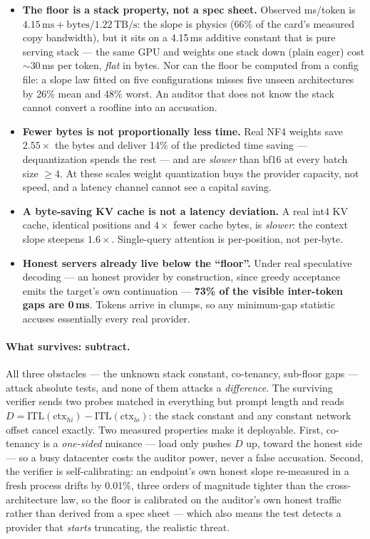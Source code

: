 \documentclass[11pt]{article}
\begin{document}
\begin{itemize}
\item \textbf{The floor is a stack property, not a spec sheet.} Observed ms/token
is $4.15\,\text{ms} + \text{bytes}/1.22\,\text{TB/s}$: the slope is physics (66\%
of the card's measured copy bandwidth), but it sits on a 4.15\,ms additive
constant that is pure serving stack --- the same GPU and weights one stack down
(plain eager) cost ${\sim}30$\,ms per token, \emph{flat} in bytes. Nor can the
floor be computed from a config file: a slope law fitted on five configurations
misses five unseen architectures by 26\% mean and 48\% worst. An auditor that
does not know the stack cannot convert a roofline into an accusation.
\item \textbf{Fewer bytes is not proportionally less time.} Real NF4 weights save
$2.55\times$ the bytes and deliver 14\% of the predicted time saving ---
dequantization spends the rest --- and are \emph{slower} than bf16 at every batch
size $\ge 4$. At these scales weight quantization buys the provider capacity, not
speed, and a latency channel cannot see a capital saving.
\item \textbf{A byte-saving KV cache is not a latency deviation.} A real int4 KV
cache, identical positions and $4\times$ fewer cache bytes, is \emph{slower}: the
context slope steepens $1.6\times$. Single-query attention is per-position, not
per-byte.
\item \textbf{Honest servers already live below the ``floor''.} Under real
speculative decoding --- an honest provider by construction, since greedy
acceptance emits the target's own continuation --- \textbf{73\% of the visible
inter-token gaps are 0\,ms}. Tokens arrive in clumps, so any minimum-gap
statistic accuses essentially every real provider.
\end{itemize}

\paragraph{What survives: subtract.} All three obstacles --- the unknown stack
constant, co-tenancy, sub-floor gaps --- attack absolute tests, and none of them
attacks a \emph{difference}. The surviving verifier sends two probes matched in
everything but prompt length and reads $D = \mathrm{ITL}(\text{ctx}_{hi}) -
\mathrm{ITL}(\text{ctx}_{lo})$: the stack constant and any constant network offset
cancel exactly. Two measured properties make it deployable. First, co-tenancy is a
\emph{one-sided} nuisance --- load only pushes $D$ up, toward the honest side ---
so a busy datacenter costs the auditor power, never a false accusation. Second,
the verifier is self-calibrating: an endpoint's own honest slope re-measured in a
fresh process drifts by 0.01\%, three orders of magnitude tighter than the
cross-architecture law, so the floor is calibrated on the auditor's own honest
traffic rather than derived from a spec sheet --- which also means the test
detects a provider that \emph{starts} truncating, the realistic threat.
\end{document}
